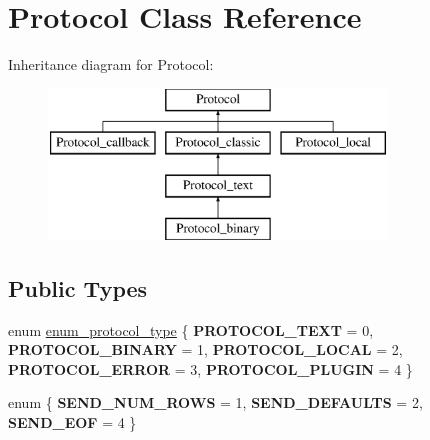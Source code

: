 \hypertarget{classProtocol}{}\section{Protocol Class Reference}
\label{classProtocol}
Inheritance diagram for Protocol\+:\begin{figure}[H]
\begin{center}
\leavevmode
\includegraphics[height=4.000000cm]{classProtocol}
\end{center}
\end{figure}
\subsection*{Public Types}
\begin{DoxyCompactItemize}
\item 
enum \mbox{\hyperlink{classProtocol_ab1d147a8122f4ea4f8516ee23c514b02}{enum\+\_\+protocol\+\_\+type}} \{ \newline
{\bfseries P\+R\+O\+T\+O\+C\+O\+L\+\_\+\+T\+E\+XT} = 0, 
{\bfseries P\+R\+O\+T\+O\+C\+O\+L\+\_\+\+B\+I\+N\+A\+RY} = 1, 
{\bfseries P\+R\+O\+T\+O\+C\+O\+L\+\_\+\+L\+O\+C\+AL} = 2, 
{\bfseries P\+R\+O\+T\+O\+C\+O\+L\+\_\+\+E\+R\+R\+OR} = 3, 
\newline
{\bfseries P\+R\+O\+T\+O\+C\+O\+L\+\_\+\+P\+L\+U\+G\+IN} = 4
 \}
\item 
enum \{ {\bfseries S\+E\+N\+D\+\_\+\+N\+U\+M\+\_\+\+R\+O\+WS} = 1, 
{\bfseries S\+E\+N\+D\+\_\+\+D\+E\+F\+A\+U\+L\+TS} = 2, 
{\bfseries S\+E\+N\+D\+\_\+\+E\+OF} = 4
 \}
\end{DoxyCompactItemize}

